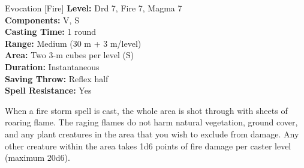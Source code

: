 {Evocation [Fire]}
{
	\textbf{Level:}
	Drd 7, Fire 7, Magma 7\\
	\textbf{Components:}
	V, S\\
	\textbf{Casting Time:}
	1 round\\
	\textbf{Range:}
	Medium (30 m + 3 m/level)\\
	\textbf{Area:}
	Two 3-m cubes per level (S)\\
	\textbf{Duration:}
	Instantaneous\\
	\textbf{Saving Throw:}
	Reflex half\\
	\textbf{Spell Resistance:}
	Yes\\
}
{
	When a fire storm spell is cast, the whole area is shot through with sheets of roaring flame. The raging flames do not harm natural vegetation, ground cover, and any plant creatures in the area that you wish to exclude from damage. Any other creature within the area takes 1d6 points of fire damage per caster level (maximum 20d6).

}
